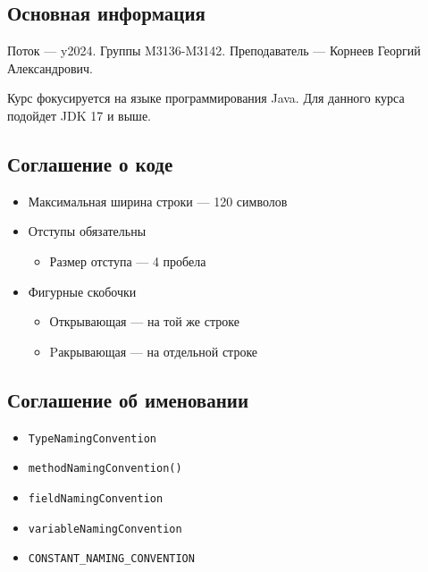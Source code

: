 \subsection{Основная информация}
Поток — y2024.\newline
Группы M3136-M3142.\newline
Преподаватель --- Корнеев Георгий Александрович.\par
Курс фокусируется на языке программирования Java.\newline
Для данного курса подойдет JDK 17 и выше.

\subsection{Соглашение о коде}
\begin{itemize}
\item Максимальная ширина строки --- 120 символов
\item Отступы обязательны
\begin{itemize}
    \item Размер отступа --- 4 пробела
\end{itemize}
\item Фигурные скобочки
\begin{itemize}
    \item Открывающая --- на той же строке
    \item Pакрывающая --- на отдельной строке
\end{itemize}
\end{itemize}

\subsection{Соглашение об именовании}
\begin{itemize}
    \item \texttt{TypeNamingConvention}
    \item \texttt{methodNamingConvention()}
    \item \texttt{fieldNamingConvention}
    \item \texttt{variableNamingConvention}
    \item \texttt{CONSTANT\_NAMING\_CONVENTION}
\end{itemize}
